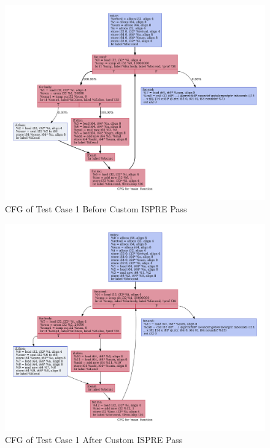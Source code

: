 \documentclass[sigplan,screen]{acmart}
\begin{document}
\begin{figure}
\begin{center}
\includegraphics[width=0.95\linewidth]{ispre_test1.cfg.pdf}
\caption{CFG of Test Case 1 Before Custom ISPRE Pass}
\label{fig:no_ispre_cfg}
\end{center}
\end{figure}


\begin{figure}
\begin{center}
\includegraphics[width=0.95\linewidth]{ispre_test1.ispre.cfg.pdf}
\caption{CFG of Test Case 1 After Custom ISPRE Pass}
\label{fig:ispre_cfg}
\end{center}
\end{figure}
 
	
	
\end{document}
